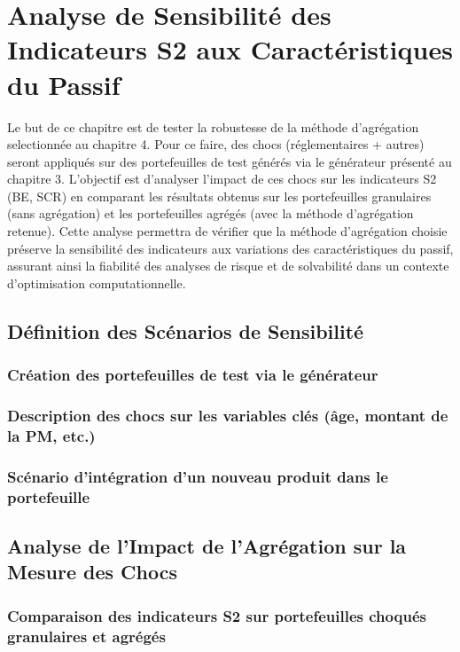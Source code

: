 \chapter{Analyse de Sensibilité des Indicateurs S2 aux Caractéristiques du Passif}

Le but de ce chapitre est de tester la robustesse de la méthode d'agrégation selectionnée au chapitre 4. Pour ce faire, des chocs (réglementaires + autres) seront appliqués sur des portefeuilles de test générés via le générateur présenté au chapitre 3. L'objectif est d'analyser l'impact de ces chocs sur les indicateurs S2 (BE, SCR) en comparant les résultats obtenus sur les portefeuilles granulaires (sans agrégation) et les portefeuilles agrégés (avec la méthode d'agrégation retenue). Cette analyse permettra de vérifier que la méthode d'agrégation choisie préserve la sensibilité des indicateurs aux variations des caractéristiques du passif, assurant ainsi la fiabilité des analyses de risque et de solvabilité dans un contexte d'optimisation computationnelle.
\section{Définition des Scénarios de Sensibilité}
    \subsection{Création des portefeuilles de test via le générateur}
    \subsection{Description des chocs sur les variables clés (âge, montant de la PM, etc.)}
    \subsection{Scénario d'intégration d'un nouveau produit dans le portefeuille}

\section{Analyse de l'Impact de l'Agrégation sur la Mesure des Chocs}
    \subsection{Comparaison des indicateurs S2 sur portefeuilles choqués granulaires et agrégés}
